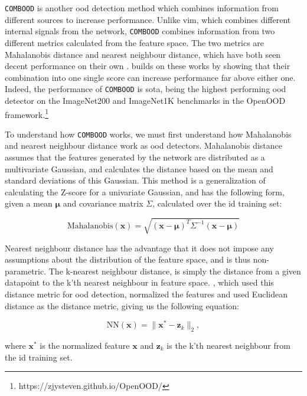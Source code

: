 \documentclass[UKenglish]{uiomasterthesis} %
\theoremstyle{definition}
\begin{document}
\texttt{COMBOOD} \cite{combood} is another \ac{ood} detection method which combines information from different sources to increase performance. Unlike \ac{vim}, which combines different internal signals from the network, \texttt{COMBOOD} combines information from two different metrics calculated from the feature space. The two metrics are Mahalanobis distance and nearest neighbour distance, which have both seen decent performance on their own \cite{nearestneighbour, mahalanobis}. \cite{combood} builds on these works by showing that their combination into one single score can increase performance far above either one. Indeed, the performance of \texttt{COMBOOD} is \acl{sota}, being the highest performing \ac{ood} detector on the ImageNet200 and ImageNet1K benchmarks in the OpenOOD framework.\footnote{https://zjysteven.github.io/OpenOOD/}

To understand how \texttt{COMBOOD} works, we must first understand how Mahalanobis and nearest neighbour distance work as \ac{ood} detectors. Mahalanobis distance assumes that the features generated by the network are distributed as a multivariate Gaussian, and calculates the distance based on the mean and standard deviations of this Gaussian. This method is a generalization of calculating the Z-score for a univariate Gaussian, and has the following form, given a mean $\bm{\mu}$ and covariance matrix $\Sigma$, calculated over the \ac{id} training set:

\begin{equation}
    \text{Mahalanobis}(\bm{x}) = \sqrt{(\bm{x} - \bm{\mu})^T\Sigma^{-1}(\bm{x} - \bm{\mu})}
\end{equation}

Nearest neighbour distance has the advantage that it does not impose any assumptions about the distribution of the feature space, and is thus non-parametric. The k-nearest neighbour distance, is simply the distance from a given datapoint to the k'th nearest neighbour in feature space. \cite{nearestneighbour}, which used this distance metric for \ac{ood} detection, normalized the features and used Euclidean distance as the distance metric, giving us the following equation:

\begin{equation}
    \text{NN}(\bm{x}) = \| \bm{x^*} - \bm{z}_k \|_2,
\end{equation}

where $\bm{x^*}$ is the normalized feature $\bm{x}$ and $\bm{z}_k$ is the k'th nearest neighbour from the \ac{id} training set.
\end{document}
